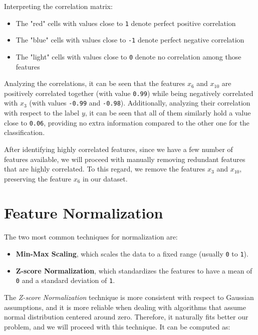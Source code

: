 Interpreting the correlation matrix:
\begin{itemize}
    \item The "red" cells with values close to \texttt{1} denote perfect positive correlation
    \item The "blue" cells with values close to \texttt{-1} denote perfect negative correlation
    \item The "light" cells with values close to \texttt{0} denote no correlation among those features
\end{itemize}

Analyzing the correlations, it can be seen that the features $x_6$ and $x_{10}$ are positively correlated together (with value \texttt{0.99}) while being negatively correlated with $x_3$ (with values \texttt{-0.99} and \texttt{-0.98}). Additionally, analyzing their correlation with respect to the label $y$, it can be seen that all of them similarly hold a value close to \texttt{0.06}, providing no extra information compared to the other one for the classification.

After identifying highly correlated features, since we have a few number of features available, we will proceed with manually removing redundant features that are highly correlated. To this regard, we remove the features $x_3$ and $x_{10}$, preserving the feature $x_6$ in our dataset.

\section{Feature Normalization}

The two most common techniques for normalization are:
\begin{itemize}
    \item \textbf{Min-Max Scaling}, which scales the data to a fixed range (usually \texttt{0} to \texttt{1}).
    \item \textbf{Z-score Normalization}, which standardizes the features to have a mean of \texttt{0} and a standard deviation of \texttt{1}.
\end{itemize}


The \textit{Z-score Normalization} technique is more consistent with respect to Gaussian assumptions, and it is more reliable when dealing with algorithms that assume normal distribution centered around zero. Therefore, it naturally fits better our problem, and we will proceed with this technique. It can be computed as:

